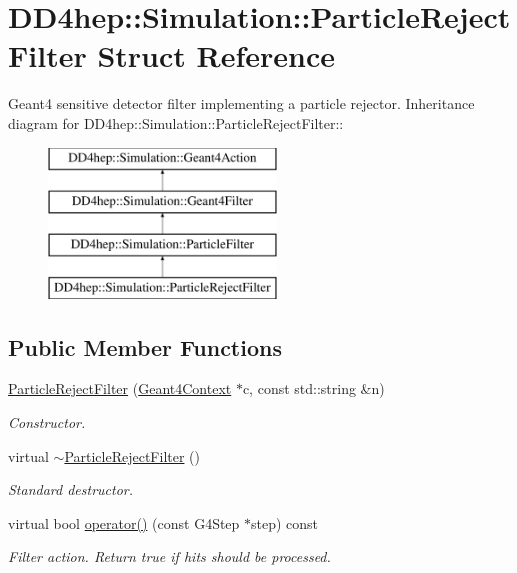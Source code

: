 \hypertarget{struct_d_d4hep_1_1_simulation_1_1_particle_reject_filter}{
\section{DD4hep::Simulation::ParticleRejectFilter Struct Reference}
\label{struct_d_d4hep_1_1_simulation_1_1_particle_reject_filter}
}


Geant4 sensitive detector filter implementing a particle rejector.  
Inheritance diagram for DD4hep::Simulation::ParticleRejectFilter::\begin{figure}[H]
\begin{center}
\leavevmode
\includegraphics[height=4cm]{struct_d_d4hep_1_1_simulation_1_1_particle_reject_filter}
\end{center}
\end{figure}
\subsection*{Public Member Functions}
\begin{DoxyCompactItemize}
\item 
\hyperlink{struct_d_d4hep_1_1_simulation_1_1_particle_reject_filter_aa06fb54a0ef772c1de13df2c32942adb}{ParticleRejectFilter} (\hyperlink{class_d_d4hep_1_1_simulation_1_1_geant4_context}{Geant4Context} $\ast$c, const std::string \&n)
\begin{DoxyCompactList}\small\item\em Constructor. \item\end{DoxyCompactList}\item 
virtual \hyperlink{struct_d_d4hep_1_1_simulation_1_1_particle_reject_filter_a3e870813c0699826fd9e01deab351ba8}{$\sim$ParticleRejectFilter} ()
\begin{DoxyCompactList}\small\item\em Standard destructor. \item\end{DoxyCompactList}\item 
virtual bool \hyperlink{struct_d_d4hep_1_1_simulation_1_1_particle_reject_filter_a4fee0c9944f21ec58360f415427b601f}{operator()} (const G4Step $\ast$step) const 
\begin{DoxyCompactList}\small\item\em Filter action. Return true if hits should be processed. \item\end{DoxyCompactList}\end{DoxyCompactItemize}


